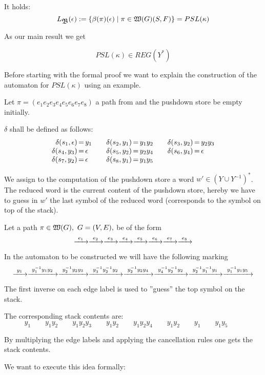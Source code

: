 It holds:
\[ L_{\mbox{$\mathfrak{B}$}}(\epsilon) := \mbox{$\{\beta(\pi)(\epsilon) \mid \pi
\in \mbox{$\mathfrak{W}(G)$}(S, F)\}$} = PSL(\kappa)
\]

\bigskip
As our main result we get
\begin{theorem}
\[ PSL(\kappa) \in REG(Y^*) \]
\end{theorem}

Before starting with the formal proof we want to explain the construction of the
automaton for $PSL(\kappa)$ using an example.

Let $\pi = (e_1 e_2 e_3 e_4 e_5 e_6 e_7 e_8)$ a path from  and the
pushdown store be empty initially.

$\delta$ shall be defined as follows:
\[\begin{array}{r@{\,=\,}l@{\qquad}r@{\,=\,}l@{\qquad}r@{\,=\,}l}
\delta(s_1,\epsilon)&y_1 & \delta(s_2,y_1)&y_1y_2 & \delta(s_3,y_2)&y_2y_3 \\
\delta(s_4,y_3)&\epsilon & \delta(s_5,y_2)&y_2y_4 & \delta(s_6,y_4)&\epsilon \\
\delta(s_7,y_2)&\epsilon & \delta(s_8,y_1)&y_1y_5
\end{array}\]

We assign to the computation of the pushdown store a word $w' \in (Y\cup
Y^{-1})^*$. The reduced word is the current content of the pushdown store,
hereby we have to guess in $w'$ the last symbol of the reduced word
(corresponds to the symbol on top of the stack).

Let a path $\pi \in \pathcat{G},\ G=(V,E),$ be of the form
\[ \xrightarrow{\ {e_1}\ } \xrightarrow{\ {e_2}\ } \xrightarrow{\ {e_3}\ } \xrightarrow{\ {e_4}\ } \xrightarrow{\ {e_5}\ } \xrightarrow{\ {e_6}\ } \xrightarrow{\ {e_7}\ }
\xrightarrow{\ {e_8}\ } \]

In the automaton to be constructed we will have the following marking
\[ \xrightarrow{\ {y_1}\ } \xrightarrow{\ {y_1^{-1} y_1 y_2}\ } \xrightarrow{\ {y_2^{-1} y_2 y_3}\ } \xrightarrow{\ {y_3^{-1}
y_2^{-1} y_2}\ } \xrightarrow{\ {y_2^{-1} y_2 y_4}\ } \xrightarrow{\ {y_4^{-1} y_2^{-1} y_2}\ }
\xrightarrow{\ {y_2^{-1} y_1^{-1} y_1}\ } \xrightarrow{\ {y_1^{-1} y_1 y_5}\ }
\]

The first inverse on each edge label is used to ''guess'' the top symbol on
the stack.

The corresponding stack contents are:
\[ y_1 \qquad y_1 y_2 \qquad y_1 y_2 y_3 \qquad y_1 y_2 \qquad y_1 y_2 y_4
\qquad y_1 y_2 \qquad y_1 \qquad y_1 y_5 \qquad \]

By multiplying the edge labels and applying the cancellation rules one gets the
stack contents.

We want to execute this idea formally:

